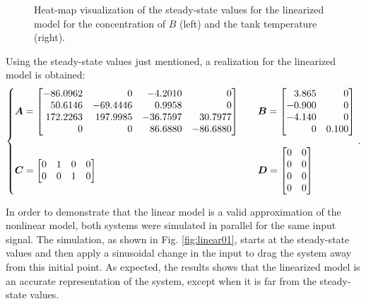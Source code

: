 \documentclass[a4paper,11pt]{book}
\numberwithin{figure}{chapter}
\numberwithin{equation}{chapter}
\numberwithin{table}{chapter}
\theoremstyle{definition}
\begin{document}
\begin{figure}[ht]
	\caption{Heat-map visualization of the steady-state values for the linearized model for the concentration of $B$ (left) and the tank temperature (right).}
	\label{fig:ssValues}
\end{figure}

Using the steady-state values just mentioned, a realization for the linearized model is obtained:
\begin{align}   \label{eq:exoReact01}
\left\{ \begin{matrix*}[l]
    \bm{A} = \begin{bmatrix*}[r]
		  -86.0962 &        0 &  -4.2010 &        0 \\
		   50.6146 & -69.4446 &   0.9958 &        0 \\
		  172.2263 & 197.9985 & -36.7597 &  30.7977 \\
		         0 &       0  &  86.6880 & -86.6880
    \end{bmatrix*} \hfill & &
    \bm{B} = \begin{bmatrix*}[r]
		 3.865  &       0 \\
		-0.900  &       0 \\
		-4.140  &       0 \\
		      0  &  0.100
    \end{bmatrix*} \hfill \\  \\ 
    \bm{C} = \begin{bmatrix}
        0 & 1 & 0 & 0 \\ 0 & 0 & 1 & 0
    \end{bmatrix} \hfill & &
    \bm{D} = \begin{bmatrix}
        0 & 0 \\ 0 & 0 \\ 0 & 0 \\ 0 & 0
    \end{bmatrix} \hfill
\end{matrix*} \right.
.\end{align}

In order to demonstrate that the linear model is a valid approximation of the nonlinear model, both systems were simulated in parallel for the same input signal. The simulation, as shown in Fig. \ref{fig:linear01}, starts at the steady-state values and then apply a sinusoidal change in the input to drag the system away from this initial point. As expected, the results shows that the linearized model is an accurate representation of the system, except when it is far from the steady-state values.
\end{document}
